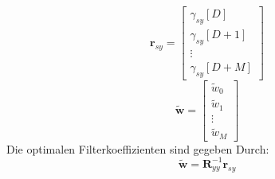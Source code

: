 \[ \textbf{r}_{sy} = \begin{bmatrix}
	\gamma_{sy}[D]\\
	\gamma_{sy}[D+1]\\
	\vdots\\
	\gamma_{sy}[D+M]
\end{bmatrix} \]
\[ \tilde{\textbf{w}} = \begin{bmatrix}
	\tilde{w}_0\\
	\tilde{w}_1\\
	\vdots\\
	\tilde{w}_M
\end{bmatrix} \]
Die optimalen Filterkoeffizienten sind gegeben Durch:
\[ \tilde{\textbf{w}} = \textbf{R}_{yy}^{-1}\textbf{r}_{sy} \]


